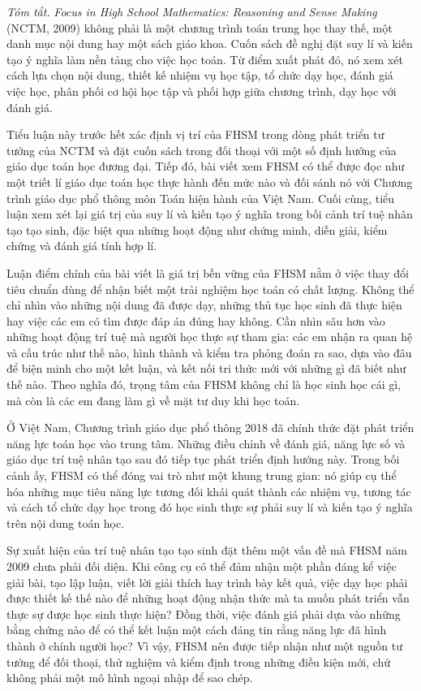 \vspace{0.75\baselineskip}

\noindent
\textit{Tóm tắt.}
\emph{Focus in High School Mathematics: Reasoning and Sense Making} (NCTM,
2009) không phải là một chương trình toán trung học thay thế, một danh mục nội dung hay một sách giáo khoa. Cuốn sách đề nghị đặt suy lí và kiến tạo ý nghĩa làm nền tảng cho việc học toán. Từ điểm xuất phát đó, nó xem xét cách lựa chọn nội dung, thiết kế nhiệm vụ học tập, tổ chức dạy học, đánh giá việc học, phân phối cơ hội học tập và phối hợp giữa chương trình, dạy học với đánh giá.

Tiểu luận này trước hết xác định vị trí của FHSM trong dòng phát triển tư tưởng của NCTM và đặt cuốn sách trong đối thoại với một số định hướng của giáo dục toán học đương đại. Tiếp đó, bài viết xem FHSM có thể được đọc như một triết lí giáo dục toán học thực hành đến mức nào và đối sánh nó với Chương trình giáo dục phổ thông môn Toán hiện hành của Việt Nam. Cuối cùng, tiểu luận xem xét lại giá trị của suy lí và kiến tạo ý nghĩa trong bối cảnh trí tuệ nhân tạo tạo sinh, đặc biệt qua những hoạt động như chứng minh, diễn giải, kiểm chứng và đánh giá tính hợp lí.

Luận điểm chính của bài viết là giá trị bền vững của FHSM nằm ở việc thay đổi tiêu chuẩn dùng để nhận biết một trải nghiệm học toán có chất lượng. Không thể chỉ nhìn vào những nội dung đã được dạy, những thủ tục học sinh đã thực hiện hay việc các em có tìm được đáp án đúng hay không. Cần nhìn sâu hơn vào những hoạt động trí tuệ mà người học thực sự tham gia: các em nhận ra quan hệ và cấu trúc như thế nào, hình thành và kiểm tra phỏng đoán ra sao, dựa vào đâu để biện minh cho một kết luận, và kết nối tri thức mới với những gì đã biết như thế nào. Theo nghĩa đó, trọng tâm của FHSM không chỉ là học sinh học cái gì, mà còn là các em đang làm gì về mặt tư duy khi học toán.

Ở Việt Nam, Chương trình giáo dục phổ thông 2018 đã chính thức đặt phát triển năng lực toán học vào trung tâm. Những điều chỉnh về đánh giá, năng lực số và giáo dục trí tuệ nhân tạo sau đó tiếp tục phát triển định hướng này. Trong bối cảnh ấy, FHSM có thể đóng vai trò như một khung trung gian: nó giúp cụ thể hóa những mục tiêu năng lực tương đối khái quát thành các nhiệm vụ, tương tác và cách tổ chức dạy học trong đó học sinh thực sự phải suy lí và kiến tạo ý nghĩa trên nội dung toán học.

Sự xuất hiện của trí tuệ nhân tạo tạo sinh đặt thêm một vấn đề mà FHSM năm 2009 chưa phải đối diện. Khi công cụ có thể đảm nhận một phần đáng kể việc giải bài, tạo lập luận, viết lời giải thích hay trình bày kết quả, việc dạy học phải được thiết kế thế nào để những hoạt động nhận thức mà ta muốn phát triển vẫn thực sự được học sinh thực hiện? Đồng thời, việc đánh giá phải dựa vào những bằng chứng nào để có thể kết luận một cách đáng tin rằng năng lực đã hình thành ở chính người học? Vì vậy, FHSM nên được tiếp nhận như một nguồn tư tưởng để đối thoại, thử nghiệm và kiểm định trong những điều kiện mới, chứ không phải một mô hình ngoại nhập để sao chép.

